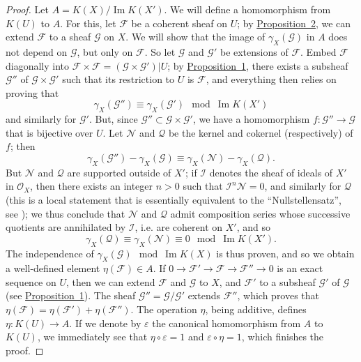 \documentclass{article}
\newcommand{\scr}[1]{{\mathscr{#1}}}
\newcommand{\oldpage}[1]{\marginpar{\footnotesize$\Big\vert$ \textit{p.~#1}}}
\begin{document}
\begin{proof}
  Let $A=K(X)/\operatorname{Im} K(X')$.
  We will define a homomorphism from $K(U)$ to $A$.
  For this, let $\scr{F}$ be a coherent sheaf on $U$;
  by \hyperref[proposition2]{Proposition~2}, we can extend $\scr{F}$ to a sheaf $\scr{G}$ on $X$.
  We will show that the image of $\gamma_X(\scr{G})$ in $A$ does not depend on $\scr{G}$, but only on $\scr{F}$.
  So let $\scr{G}$ and $\scr{G}'$ be extensions of $\scr{F}$.
  Embed $\scr{F}$ diagonally into $\scr{F}\times\scr{F}=(\scr{G}\times\scr{G}')|U$;
  by \hyperref[proposition1]{Proposition~1}, there exists a subsheaf $\scr{G}''$ of $\scr{G}\times\scr{G}'$ such that its restriction to $U$ is $\scr{F}$, and everything then relies on proving that
  \[
    \gamma_X(\scr{G}'') \equiv \gamma_X(\scr{G}') \mod \operatorname{Im}K(X')
  \]
  and similarly for $\scr{G}'$.
  But, since $\scr{G}''\subset\scr{G}\times\scr{G}'$, we have a homomorphism $f\colon\scr{G}''\to\scr{G}$ that is bijective over $U$.
  Let $\scr{N}$ and $\scr{Q}$ be the kernel and cokernel (respectively) of $f$;
  then
  \[
    \gamma_X(\scr{G}'') - \gamma_X(\scr{G})
    \equiv \gamma_X(\scr{N}) - \gamma_X(\scr{Q}).
  \]
  But $\scr{N}$ and $\scr{Q}$ are supported outside of $X'$;
  if $\scr{I}$ denotes the sheaf
\oldpage{116}
  of ideals of $X'$ in $\scr{O}_X$, then there exists an integer $n>0$ such that $\scr{I}^n\scr{N}=0$, and similarly for $\scr{Q}$ (this is a local statement that is essentially equivalent to the ``Nullstellensatz'', see \cite{14});
  we thus conclude that $\scr{N}$ and $\scr{Q}$ admit composition series whose successive quotients are annihilated by $\scr{I}$, i.e. are coherent on $X'$, and so
  \[
    \gamma_X(\scr{Q}) \equiv \gamma_X(\scr{N}) \equiv 0 \mod \operatorname{Im}K(X').
  \]
  The independence of $\gamma_X(\scr{G}) \mod\operatorname{Im}K(X)$ is thus proven, and so we obtain a well-defined element $\eta(\scr{F})\in A$.
  If $0\to\scr{F}'\to\scr{F}\to\scr{F}''\to0$ is an exact sequence on $U$, then we can extend $\scr{F}$ and $\scr{G}$ to $X$, and $\scr{F}'$ to a subsheaf $\scr{G}'$ of $\scr{G}$ (see \hyperref[proposition1]{Proposition~1}).
  The sheaf $\scr{G}''=\scr{G}/\scr{G}'$ extends $\scr{F}''$, which proves that $\eta(\scr{F})=\eta(\scr{F}')+\eta(\scr{F}'')$.
  The operation $\eta$, being additive, defines $\eta\colon K(U)\to A$.
  If we denote by $\varepsilon$ the canonical homomorphism from $A$ to $K(U)$, we immediately see that $\eta\circ\varepsilon=1$ and $\varepsilon\circ\eta=1$, which finishes the proof.
\end{proof}
\end{document}
